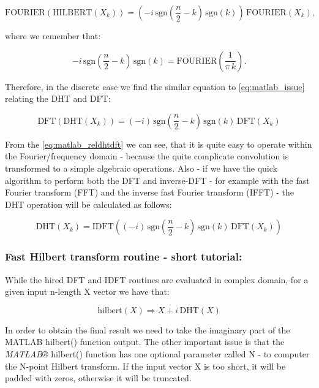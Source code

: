 \documentclass[12pt,twoside,a4paper]{article}
\numberwithin{equation}{subsection}
\numberwithin{figure}{subsection}
\begin{document}
\begin{equation} \label{eq:matlab_issue}
  \mathrm{FOURIER}(\mathrm{HILBERT}(X_k))=( - i\,\mathrm{sgn}( \frac {n}{2} - k)\,\mathrm{sgn}(k))\,\mathrm{FOURIER}({X_{k}}),
\end{equation}

where we remember that:

\begin{equation} \label{eq:matlab_kernel}
   - i\,\mathrm{sgn}(\frac {n}{2} - k)\,\mathrm{sgn}(k)=\mathrm{FOURIER}(\frac {1}{\pi \,k}) .
\end{equation}

Therefore, in the discrete case we find the similar equation to \ref{eq:matlab_issue} relating the DHT and DFT:

\begin{equation} \label{eq:matlab_reldhtdft}
  \mathrm{DFT}(\mathrm{DHT}({X_{k}}))=( - i)\,\mathrm{sgn}(\frac {n}{2} - k)\,\mathrm{sgn}(k)\,\mathrm{DFT}({X_{k}})
\end{equation}

From the \ref{eq:matlab_reldhtdft} we can see, that it is quite easy to operate within the Fourier/frequency domain - because the
quite complicate convolution is transformed to a simple algebraic operations. Also - if we have the quick algorithm to perform both
the DFT and inverse-DFT - for example with the fast Fourier transform (FFT) and the inverse fast Fourier transform (IFFT) - the DHT
operation will be calculated as follows:

\begin{equation} \label{eq:matlab_fulldhthdf}
  \mathrm{DHT}({X_{k}})=\mathrm{IDFT}(( - i)\,\mathrm{sgn}(\frac {n}{2} - k)\,\mathrm{sgn}(k)\,\mathrm{DFT}({X_{k}}))
\end{equation}

\subsubsection*{Fast Hilbert transform routine - short tutorial:}

While the hired DFT and IDFT routines are evaluated in complex domain, for a given input n-length X vector we have that:

\begin{equation} \label{eq:matlab_implication}
  \mathrm{hilbert}(X) \Rightarrow X + i\,\mathrm{DHT}(X)
\end{equation}

In order to obtain the final result we need to take the imaginary part of the MATLAB hilbert() function output. The other
important issue is that the \textit{MATLAB®} hilbert() function has one optional parameter called N - to computer the N-point
Hilbert transform. If the input vector X is too short, it will be padded with zeros, otherwise it will be truncated. 
\end{document}
